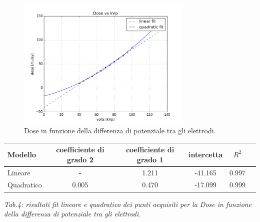 \documentclass[a4paper]{article}
\begin{document}
\begin{figure}[H]
\centering
\includegraphics[width=0.75\textwidth]{dosevsvolts.png}
\caption{Dose in funzione della differenza di potenziale tra gli elettrodi.}
\end{figure}

\begin{center} 
		
		\begin{tabular}{lccccc}
			\hline
			\hline
			\textbf{Modello}	& \textbf{coefficiente di grado 2}& \textbf{coefficiente di grado 1}& \textbf{intercetta}&  \textbf{$R^{2}$} 	 \\
			\hline
			\hline
			Lineare	&-&1.211&-41.165&0.997	\\
			Quadratico	&0.005&0.470&-17.099&0.999\\
			
			
			\hline
			\hline
		\end{tabular}
		\linebreak
		\emph{Tab.4: risultati fit lineare e quadratico dei punti acquisiti per la Dose in funzione della differenza di potenziale tra gli elettrodi.} 
	\end{center} 
\end{document}
